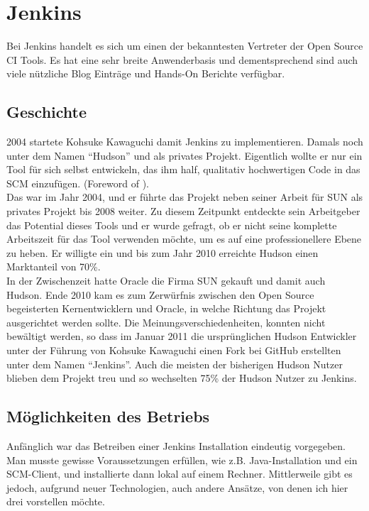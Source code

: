 \pagebreak

\chapter{Jenkins}
Bei Jenkins handelt es sich um einen der bekanntesten Vertreter der Open Source CI Tools. Es hat eine sehr breite Anwenderbasis und dementsprechend sind auch viele nützliche Blog Einträge und Hands-On Berichte verfügbar.
\section{Geschichte}
2004 startete Kohsuke Kawaguchi damit Jenkins zu implementieren. Damals noch unter dem Namen "`Hudson"' und als privates Projekt. Eigentlich wollte er nur ein Tool für sich selbst entwickeln, das ihm half, qualitativ hochwertigen Code in das SCM einzufügen. (Foreword of \cite{smart2011jenkins}).\\
Das war im Jahr 2004, und er führte das Projekt neben seiner Arbeit für SUN als privates Projekt bis 2008 weiter. Zu diesem Zeitpunkt entdeckte sein Arbeitgeber das Potential dieses Tools und er wurde gefragt, ob er nicht seine komplette Arbeitszeit für das Tool verwenden möchte, um es auf eine professionellere Ebene zu heben. Er willigte ein und bis zum Jahr 2010 erreichte Hudson einen Marktanteil von 70\%.\cite[3]{smart2011jenkins}\\
In der Zwischenzeit hatte Oracle die Firma SUN gekauft und damit auch Hudson. Ende 2010 kam es zum Zerwürfnis zwischen den Open Source begeisterten Kernentwicklern und Oracle, in welche Richtung das Projekt ausgerichtet werden sollte. Die Meinungsverschiedenheiten, konnten nicht bewältigt werden, so dass im Januar 2011 die ursprünglichen Hudson Entwickler unter der Führung von Kohsuke Kawaguchi einen Fork bei GitHub erstellten unter dem Namen "`Jenkins"'. Auch die meisten der bisherigen Hudson Nutzer blieben dem Projekt treu und so wechselten 75\% der Hudson Nutzer zu Jenkins. \cite[3-4]{smart2011jenkins}
\section{Möglichkeiten des Betriebs}
Anfänglich war das Betreiben einer Jenkins Installation  eindeutig vorgegeben. Man musste gewisse Voraussetzungen erfüllen, wie z.B. Java-Installation und ein SCM-Client, und installierte dann lokal auf einem Rechner. Mittlerweile gibt es jedoch, aufgrund neuer Technologien, auch andere Ansätze, von denen ich hier drei vorstellen möchte.
